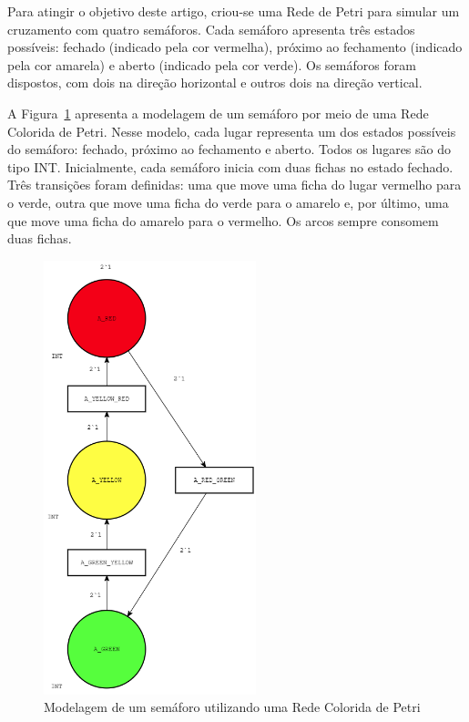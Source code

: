Para atingir o objetivo deste artigo, criou-se uma Rede de Petri para simular um cruzamento com quatro semáforos.
Cada semáforo apresenta três estados possíveis: fechado (indicado pela cor vermelha), próximo ao fechamento (indicado pela cor amarela) e aberto (indicado pela cor verde).
Os semáforos foram dispostos, com dois na direção horizontal e outros dois na direção vertical.

A Figura~\ref{fig:traffic_light} apresenta a modelagem de um semáforo por meio de uma Rede Colorida de Petri.
Nesse modelo, cada lugar representa um dos estados possíveis do semáforo: fechado, próximo ao fechamento e aberto.
Todos os lugares são do tipo INT\@.
Inicialmente, cada semáforo inicia com duas fichas no estado fechado.
Três transições foram definidas: uma que move uma ficha do lugar vermelho para o verde, outra que move uma ficha do verde para o amarelo e, por último, uma que move uma ficha do amarelo para o vermelho.
Os arcos sempre consomem duas fichas.

\clearpage

\begin{figure}[ht]
	\centering
	\includegraphics[width=0.55\textwidth]{images/traffic_light.png}
	\caption{Modelagem de um semáforo utilizando uma Rede Colorida de Petri}
    \label{fig:traffic_light}
\end{figure}

